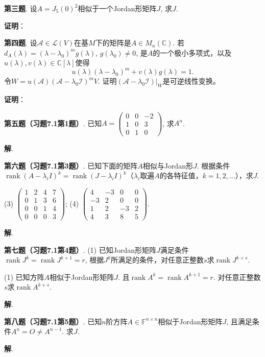 \newpageorvspace


{\bf 第三题}. 设$A = J_5(0)^2$相似于一个Jordan形矩阵$J$, 求$J$.

{\bf 证明}：


\newpageorvspace


{\bf 第四题}. 设$\mathscr{A} \in \mathcal{L}(V)$在基$M$下的矩阵是$A\in M_n(\mathbb{C})$. 若$d_A(\lambda) = (\lambda-\lambda_0)^m g(\lambda)$, $g(\lambda_0) \neq 0$, 是$A$的一个极小多项式，以及$u(\lambda), v(\lambda) \in \mathbb{C}[\lambda]$使得
$$u(\lambda)(\lambda-\lambda_0)^m + v(\lambda)g(\lambda) = 1.$$
令$W = u(\mathscr{A})(\mathscr{A} - \lambda_0\mathscr{I})^m V$. 证明$(\mathscr{A} - \lambda_0\mathscr{I})|_W$是可逆线性变换。


{\bf 证明}：


\newpageorvspace


{\bf 第五题（习题7.1第1题）}. 已知$A = \begin{pmatrix} 0 & 0 & -2 \\ 1 & 0 & 3 \\ 0 & 1 & 0 \end{pmatrix}$, 求$A^n$.

{\bf 解}. 


\newpageorvspace


{\bf 第六题（习题7.1第3题）}. 已知下面的矩阵$A$相似与Jordan形$J$. 根据条件$\operatorname{rank}(A - \lambda_i I)^k = \operatorname{rank}(J - \lambda_i I)^k$（$\lambda_i$取遍$A$的各特征值，$k=1,2,\ldots$），求$J$.

(3) $\begin{pmatrix} 1 & 2 & 4 & 7 \\ 0 & 1 & 3 & 6 \\ 0 & 0 & 1 & 4 \\ 0 & 0 & 0 & 3 \end{pmatrix}$; \quad (4) $\begin{pmatrix} 4 & -3 & 0 & 0 \\ -3 & 2 & 0 & 0 \\ 1 & 2 & -3 & 2 \\ 4 & 3 & 8 & 5 \end{pmatrix}$.

{\bf 解}. 

\newpageorvspace


{\bf 第七题（习题7.1第4题）}. (1) 已知Jordan形矩阵$J$满足条件$\operatorname{rank} J^k = \operatorname{rank} J^{k+1} = r$, 根据$J^k$所满足的条件，对任意正整数$s$求$\operatorname{rank} J^{k+s}$.

(1) 已知方阵$A$相似于Jordan形矩阵$J$. 且$\operatorname{rank} A^k = \operatorname{rank} A^{k+1} = r$. 对任意正整数$s$求$\operatorname{rank} A^{k+s}$.

{\bf 解}. 

\newpageorvspace


{\bf 第八题（习题7.1第5题）}. 已知$n$阶方阵$A \in \mathbb{F}^{n\times n}$相似于Jordan形矩阵$J$, 且满足条件$A^n = O \neq A^{n-1}$. 求$J$.

{\bf 解}. 



